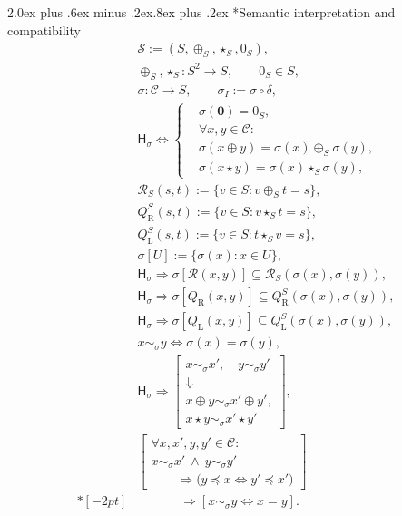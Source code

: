 \documentclass[10pt,a5paper]{article}
\makeatletter
\renewcommand\section{\@startsection{section}{1}{\z@}%
  {2.0ex plus .6ex minus .2ex}{.8ex plus .2ex}%
  {\normalfont\large\bfseries}}
\makeatother
\begin{document}
\section*{Semantic interpretation and compatibility}
\begin{align*}
&\mathscr S:=(S,\oplus_S,\star_S,0_S),
\\
&\oplus_S,\star_S:S^2\longrightarrow S,
\qquad
0_S\in S,
\\
&\sigma:\mathcal C\longrightarrow S,
\qquad
\sigma_I:=\sigma\circ\delta,
\\
&\mathsf H_{\sigma}
\iff
\left\{
\begin{aligned}
&\sigma(\mathbf 0)=0_S,
\\
&\forall x,y\in\mathcal C:
\\
&\sigma(x\oplus y)
=
\sigma(x)\oplus_S\sigma(y),
\\
&\sigma(x\star y)
=
\sigma(x)\star_S\sigma(y),
\end{aligned}
\right.
\\
&\mathcal R_S(s,t)
:=
\{v\in S:v\oplus_S t=s\},
\\
&Q_{\mathrm R}^{S}(s,t)
:=
\{v\in S:v\star_S t=s\},
\\
&Q_{\mathrm L}^{S}(s,t)
:=
\{v\in S:t\star_S v=s\},
\\
&\sigma[U]:=\{\sigma(x):x\in U\},
\\
&\mathsf H_{\sigma}
\Longrightarrow
\sigma[\mathcal R(x,y)]
\subseteq
\mathcal R_S(\sigma(x),\sigma(y)),
\\
&\mathsf H_{\sigma}
\Longrightarrow
\sigma[Q_{\mathrm R}(x,y)]
\subseteq
Q_{\mathrm R}^{S}(\sigma(x),\sigma(y)),
\\
&\mathsf H_{\sigma}
\Longrightarrow
\sigma[Q_{\mathrm L}(x,y)]
\subseteq
Q_{\mathrm L}^{S}(\sigma(x),\sigma(y)),
\\
&x\sim_{\sigma}y
\iff
\sigma(x)=\sigma(y),
\\
&\mathsf H_{\sigma}
\Longrightarrow
\left[
\begin{array}{c}
x\sim_{\sigma}x',
\quad y\sim_{\sigma}y'
\\[2pt]
\Downarrow
\\[2pt]
x\oplus y\sim_{\sigma}x'\oplus y',
\\
x\star y\sim_{\sigma}x'\star y'
\end{array}
\right],
\\
&\left[
\begin{array}{l}
\forall x,x',y,y'\in\mathcal C:
\\
x\sim_{\sigma}x'\ \land\ y\sim_{\sigma}y'
\\
\qquad\Longrightarrow
\bigl(y\preccurlyeq x
\iff y'\preccurlyeq x'\bigr)
\end{array}
\right]
\\*[-2pt]
&\hspace{40pt}\Longrightarrow
\left[
x\sim_{\sigma}y\iff x=y
\right].
\end{align*}
\end{document}
